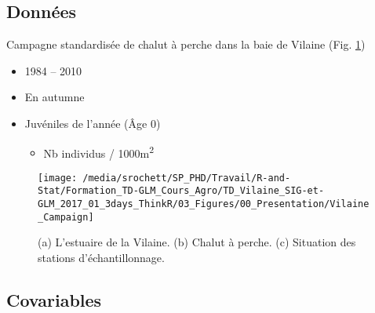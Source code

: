 \documentclass[french,a4paper]{article}
\providecommand{\tightlist}{%
  \setlength{\itemsep}{0pt}\setlength{\parskip}{0pt}}
\begin{document}
\hypertarget{donnees}{%
\subsection{Données}\label{donnees}}

Campagne standardisée de chalut à perche dans la baie de Vilaine (Fig.
\ref{fig:figVilaineCampaign})

\begin{itemize}
\tightlist
\item
  1984 -- 2010
\item
  En autumne
\item
  Juvéniles de l'année (Âge 0)

  \begin{itemize}
  \tightlist
  \item
    Nb individus / 1000m\textsuperscript{2}
  \end{itemize}
\end{itemize}




\begin{figure}[!h]

{\centering \texttt{[image: /media/srochett/SP\_PHD/Travail/R-and-Stat/Formation\_TD-GLM\_Cours\_Agro/TD\_Vilaine\_SIG-et-GLM\_2017\_01\_3days\_ThinkR/03\_Figures/00\_Presentation/Vilaine\_Campaign]} 

}

\caption{(a) L'estuaire de la Vilaine. (b) Chalut à
perche. (c) Situation des stations d'échantillonnage.}\label{fig:figVilaineCampaign}
\end{figure}

\hypertarget{covariables}{%
\subsection{Covariables}\label{covariables}}
\end{document}
